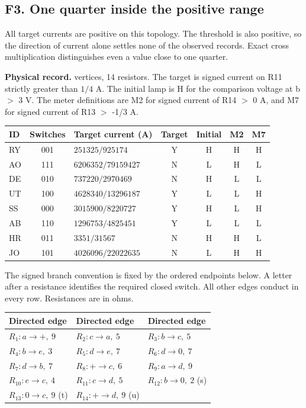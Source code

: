 \documentclass[12pt,letterpaper]{article}
\newcommand{\dossier}[2]{\clearpage\subsection*{#1}\phantomsection\label{#2}}
\newcommand{\reading}[2]{\par\smallskip\textsf{\color{accent}\bfseries #1}\enspace #2\par}
\begin{document}
\dossier{F3. One quarter inside the positive range}{dsF3}

All target currents are positive on this topology. The threshold is also positive, so the direction of current alone settles none of the observed records. Exact cross multiplication distinguishes even a value close to one quarter.

\reading{Physical record.}{7 vertices, 14 resistors. The target is signed current on R11 strictly greater than $1/4$ A. The initial lamp is H for the comparison voltage at b $>$ 3 V. The meter definitions are M2 for signed current of R14 $>$ 0 A, and M7 for signed current of R13 $>$ -1/3 A.}

\begin{center}{\small\setlength{\tabcolsep}{4pt}\begin{tabularx}{\linewidth}{@{}lcYcccc@{}}\toprule
ID & Switches & Target current (A) & Target & Initial & M2 & M7\\ \midrule
RY & 001 & $251325/925174$ & Y & H & H & H\\
AO & 111 & $6206352/79159427$ & N & L & H & L\\
DE & 010 & $737220/2970469$ & N & H & L & L\\
UT & 100 & $4628340/13296187$ & Y & L & L & H\\
SS & 000 & $3015900/8220727$ & Y & H & L & H\\
AB & 110 & $1296753/4825451$ & Y & L & L & L\\
HR & 011 & $3351/31567$ & N & H & H & L\\
JO & 101 & $4026096/22022635$ & N & L & H & H\\ \bottomrule\end{tabularx}}
\end{center}

The signed branch convention is fixed by the ordered endpoints below. A letter after a resistance identifies the required closed switch. All other edges conduct in every row. Resistances are in ohms.

\begin{center}{\footnotesize\setlength{\tabcolsep}{4pt}\begin{tabularx}{\linewidth}{@{}YYY@{}}\toprule
Directed edge & Directed edge & Directed edge\\ \midrule
$R_{1}\colon a\to +,\ 9$ & $R_{2}\colon c\to a,\ 5$ & $R_{3}\colon b\to c,\ 5$\\
$R_{4}\colon b\to e,\ 3$ & $R_{5}\colon d\to e,\ 7$ & $R_{6}\colon d\to 0,\ 7$\\
$R_{7}\colon d\to b,\ 7$ & $R_{8}\colon +\to c,\ 6$ & $R_{9}\colon a\to d,\ 9$\\
$R_{10}\colon e\to c,\ 4$ & $R_{11}\colon c\to d,\ 5$ & $R_{12}\colon b\to 0,\ 2$ (s)\\
$R_{13}\colon 0\to c,\ 9$ (t) & $R_{14}\colon +\to d,\ 9$ (u) & \\ \bottomrule\end{tabularx}}
\end{center}
\end{document}
